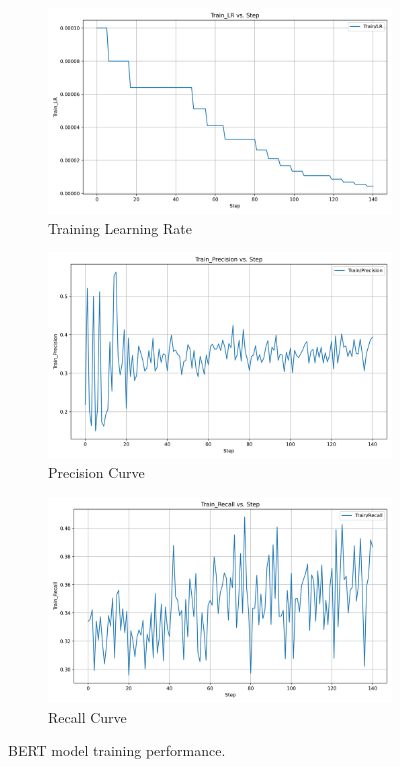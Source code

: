 \documentclass[12pt]{article}
\begin{document}
\begin{figure}[!ht]
	\begin{subfigure}[b]{0.32\textwidth}
		\includegraphics[width=\linewidth]{Train_LR.png}
		\caption{Training Learning Rate}
	\end{subfigure}
	\hfill
	\begin{subfigure}[b]{0.32\textwidth}
		\includegraphics[width=\linewidth]{Train_Precision.png}
		\caption{Precision Curve}
	\end{subfigure}
	\hfill
	\begin{subfigure}[b]{0.32\textwidth}
		\includegraphics[width=\linewidth]{Train_Recall.png}
		\caption{Recall Curve}
	\end{subfigure}
	\caption{BERT model training performance.}
	\label{fig:bert_training_performance}
\end{figure}
\end{document}
